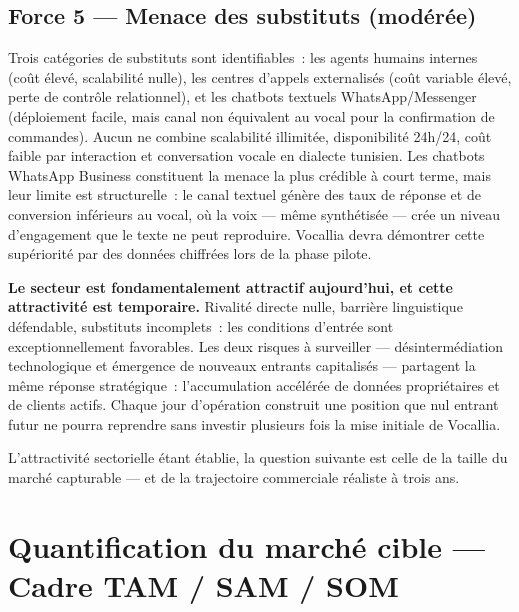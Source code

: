 \subsection{Force 5 --- Menace des substituts (modérée)}
\label{section2.2.5}

Trois catégories de substituts sont identifiables~: les agents humains internes (coût élevé, scalabilité nulle), les centres d'appels externalisés (coût variable élevé, perte de contrôle relationnel), et les chatbots textuels WhatsApp/Messenger (déploiement facile, mais canal non équivalent au vocal pour la confirmation de commandes). Aucun ne combine scalabilité illimitée, disponibilité 24h/24, coût faible par interaction et conversation vocale en dialecte tunisien. Les chatbots WhatsApp Business constituent la menace la plus crédible à court terme, mais leur limite est structurelle~: le canal textuel génère des taux de réponse et de conversion inférieurs au vocal, où la voix --- même synthétisée --- crée un niveau d'engagement que le texte ne peut reproduire. Vocallia devra démontrer cette supériorité par des données chiffrées lors de la phase pilote.

\begin{tcolorbox}[colback=gray!8, colframe=gray!50, title=\textbf{Attractivité sectorielle --- Verdict Porter}, fonttitle=\bfseries]
\textbf{Le secteur est fondamentalement attractif aujourd'hui, et cette attractivité est temporaire.} Rivalité directe nulle, barrière linguistique défendable, substituts incomplets~: les conditions d'entrée sont exceptionnellement favorables. Les deux risques à surveiller --- désintermédiation technologique et émergence de nouveaux entrants capitalisés --- partagent la même réponse stratégique~: l'accumulation accélérée de données propriétaires et de clients actifs. Chaque jour d'opération construit une position que nul entrant futur ne pourra reprendre sans investir plusieurs fois la mise initiale de Vocallia.
\end{tcolorbox}

L'attractivité sectorielle étant établie, la question suivante est celle de la taille du marché capturable --- et de la trajectoire commerciale réaliste à trois ans.

\section{Quantification du marché cible --- Cadre TAM / SAM / SOM}
\label{section2.3}

